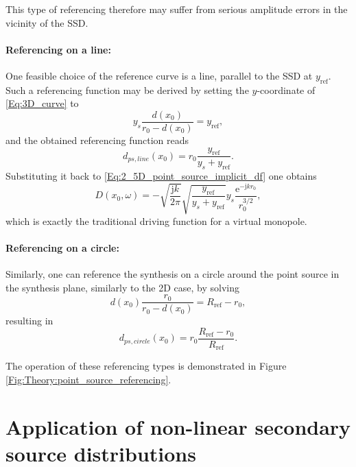 \documentclass[12pt,a4paper]{article}
\newcommand{\te}{\mathrm{e}}
\newcommand{\ti}{\mathrm{j}}
\newcommand{\yref}{y_{\mathrm{ref}}}
\begin{document}
This type of referencing therefore may suffer from serious amplitude errors in the vicinity of the SSD.

\paragraph{Referencing on a line:\\}
One feasible choice of the reference curve is a line, parallel to the SSD at $\yref$. Such a referencing function may be derived by setting the $y$-coordinate of \eqref{Eq:3D_curve} to
\begin{equation}
y_s \frac{d(x_0)}{r_0 - d(x_0)} = \yref,
\end{equation}
and the obtained referencing function reads
\begin{equation}
d_{ps,line}(x_0) = r_0 \frac{\yref}{y_s + \yref}.
\end{equation}
Substituting it back to \eqref{Eq:2_5D_point_source_implicit_df} one obtains
\begin{equation}
D(x_0,\omega) = 
- \sqrt{\frac{\ti k}{2\pi}} \sqrt{\frac{\yref}{y_s + \yref}}  y_s \frac{\te^{-\ti k r_0 }}{r_0^{3/2}},
\end{equation}
which is exactly the traditional driving function for a virtual monopole.

\paragraph{Referencing on a circle:\\}
Similarly, one can reference the synthesis on a circle around the point source in the synthesis plane, similarly to the 2D case, by solving 
\begin{equation}
d(x_0)\frac{r_0}{r_0 - d(x_0)} = R_{\mathrm{ref}} - r_0,
\end{equation}
resulting in
\begin{equation}
d_{ps,circle}(x_0)  = r_0 \frac{R_{\mathrm{ref}} - r_0}{R_{\mathrm{ref}}}.
\end{equation}

The operation of these referencing types is demonstrated in Figure \ref{Fig:Theory:point_source_referencing}.

\section{Application of non-linear secondary source distributions}
\end{document}
